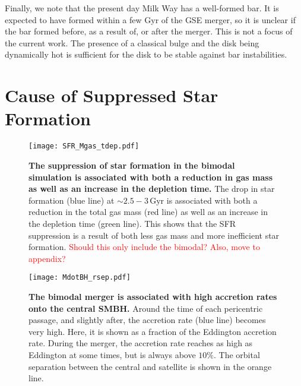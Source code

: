 \documentclass[linenumbers, twocolumn]{aastex631}
\newcommand{\Gyr}{\ensuremath{\textrm{Gyr}}}
\newcommand{\red}[1]{\textcolor{red}{#1}}
\begin{document}
Finally, we note that the present day Milk Way has a well-formed bar. It is
expected to have formed within a few Gyr of the GSE merger, so it is unclear if
the bar formed before, as a result of, or after the merger. This is not a focus
of the current work. The presence of a classical bulge and the disk being
dynamically hot is sufficient for the disk to be stable against bar
instabilities.

\section{Cause of Suppressed Star Formation}

\begin{figure*}
  \centering
  \texttt{[image: SFR\_Mgas\_tdep.pdf]}
  \caption{\textbf{The suppression of star formation in the bimodal simulation is associated with both a reduction in gas mass as well as an increase in the depletion time.} The drop in star formation (blue line) at $\sim2.5-3\,\Gyr$ is associated with both a reduction in the total gas mass (red line) as well as an increase in the depletion time (green line). This shows that the SFR suppression is a result of both less gas mass and more inefficient star formation. \red{Should this only include the bimodal? Also, move to appendix?}}
  \label{fig:SFR_Mgas_tdep}
\end{figure*}

\begin{figure}
  \centering
  \texttt{[image: MdotBH\_rsep.pdf]}
  \caption{\textbf{The bimodal merger is associated with high accretion rates onto the central SMBH.} Around the time of each pericentric passage, and slightly after, the accretion rate (blue line) becomes very high. Here, it is shown as a fraction of the Eddington accretion rate. During the merger, the accretion rate reaches as high as Eddington at some times, but is always above $10\%$. The orbital separation between the central and satellite is shown in the orange line.}
  \label{fig:MdotBH_rsep}
\end{figure}
\end{document}
